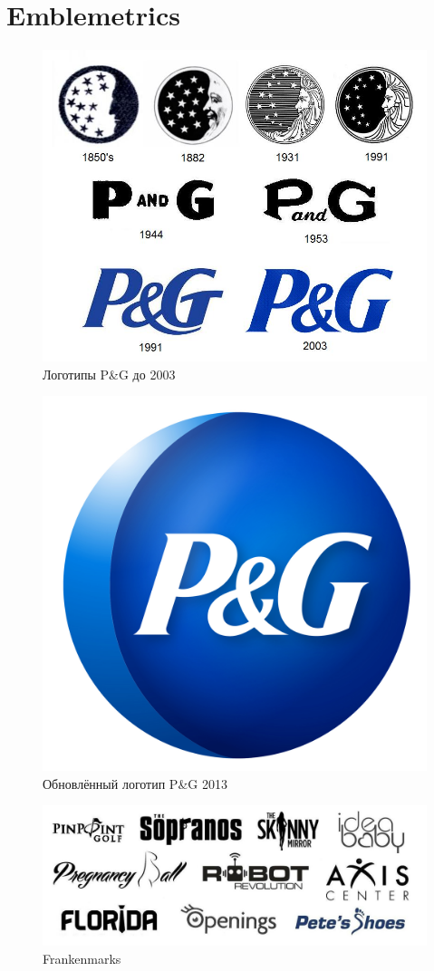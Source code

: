 \section{Emblemetrics}
\label{app:emblemetrics}

\begin{figure}[ht]
  \centering
  \includegraphics[width=.5\linewidth]{images/supplement/emblemetrics/pg2003}
  \caption{Логотипы P\&G до 2003}
  \label{fig:emblemetrics:pg2003}
\end{figure}

\begin{figure}[ht]
  \centering
  \includegraphics[width=.5\linewidth]{images/supplement/emblemetrics/pg2013}
  \caption{Обновлённый логотип P\&G 2013}
  \label{fig:emblemetrics:pg2013}
\end{figure}

\begin{figure}[ht]
  \centering
  \includegraphics[width=.5\linewidth]{images/supplement/emblemetrics/frankenmarks}
  \caption{Frankenmarks}
  \label{fig:emblemetrics:frankenmarks}
\end{figure}

